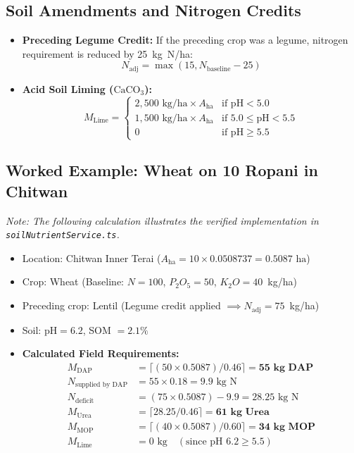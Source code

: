 \documentclass[11pt,a4paper]{report}
\begin{document}
\subsection{Soil Amendments and Nitrogen Credits}
\begin{itemize}
  \item \textbf{Preceding Legume Credit:} If the preceding crop was a legume, nitrogen requirement is reduced by 25~kg~N/ha:
  \begin{equation}
    N_{\text{adj}} = \max(15, N_{\text{baseline}} - 25)
  \end{equation}
  \item \textbf{Acid Soil Liming ($\text{CaCO}_3$):}
  \begin{equation}
    M_{\text{Lime}} = \begin{cases}
      2,500\text{ kg/ha} \times A_{\text{ha}} & \text{if } \text{pH} < 5.0 \\
      1,500\text{ kg/ha} \times A_{\text{ha}} & \text{if } 5.0 \le \text{pH} < 5.5 \\
      0 & \text{if } \text{pH} \ge 5.5
    \end{cases}
  \end{equation}
\end{itemize}

\subsection{Worked Example: Wheat on 10 Ropani in Chitwan}
\textit{Note: The following calculation illustrates the verified implementation in \texttt{soilNutrientService.ts}.}
\begin{itemize}
  \item Location: Chitwan Inner Terai ($A_{\text{ha}} = 10 \times 0.0508737 = 0.5087\text{ ha}$)
  \item Crop: Wheat (Baseline: $N=100$, $P_2O_5=50$, $K_2O=40$~kg/ha)
  \item Preceding crop: Lentil (Legume credit applied $\implies N_{\text{adj}} = 75$~kg/ha)
  \item Soil: $\text{pH} = 6.2$, SOM $= 2.1\%$
  \item \textbf{Calculated Field Requirements:}
  \begin{align*}
    M_{\text{DAP}} &= \lceil (50 \times 0.5087) / 0.46 \rceil = \mathbf{55\text{ kg DAP}} \\
    N_{\text{supplied by DAP}} &= 55 \times 0.18 = 9.9\text{ kg N} \\
    N_{\text{deficit}} &= (75 \times 0.5087) - 9.9 = 28.25\text{ kg N} \\
    M_{\text{Urea}} &= \lceil 28.25 / 0.46 \rceil = \mathbf{61\text{ kg Urea}} \\
    M_{\text{MOP}} &= \lceil (40 \times 0.5087) / 0.60 \rceil = \mathbf{34\text{ kg MOP}} \\
    M_{\text{Lime}} &= 0\text{ kg} \quad (\text{since } \text{pH } 6.2 \ge 5.5)
  \end{align*}
\end{itemize}
\end{document}
